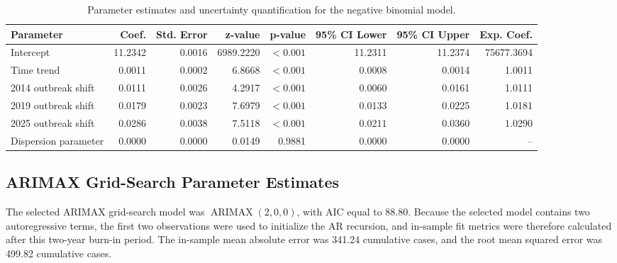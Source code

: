 \documentclass[utf8]{FrontiersinHarvard} %
\begin{document}
\begin{table}[h!]
\centering
\caption{Parameter estimates and uncertainty quantification for the negative binomial model.}
\label{tab:negative_binomial_parameter_uncertainty}
\tiny
\begin{tabular}{lrrrrrrr}
\toprule
Parameter & Coef. & Std. Error & z-value & p-value & 95\% CI Lower & 95\% CI Upper & Exp. Coef. \\
\midrule
Intercept & 11.2342 & 0.0016 & 6989.2220 & $<0.001$ & 11.2311 & 11.2374 & 75677.3694 \\
Time trend & 0.0011 & 0.0002 & 6.8668 & $<0.001$ & 0.0008 & 0.0014 & 1.0011 \\
2014 outbreak shift & 0.0111 & 0.0026 & 4.2917 & $<0.001$ & 0.0060 & 0.0161 & 1.0111 \\
2019 outbreak shift & 0.0179 & 0.0023 & 7.6979 & $<0.001$ & 0.0133 & 0.0225 & 1.0181 \\
2025 outbreak shift & 0.0286 & 0.0038 & 7.5118 & $<0.001$ & 0.0211 & 0.0360 & 1.0290 \\
Dispersion parameter & 0.0000 & 0.0000 & 0.0149 & 0.9881 & 0.0000 & 0.0000 & -- \\
\bottomrule
\end{tabular}
\end{table}

\subsection{ARIMAX Grid-Search Parameter Estimates}
The selected ARIMAX grid-search model was \(\operatorname{ARIMAX}(2,0,0)\), with AIC equal to \(88.80\). Because the selected model contains two autoregressive terms, the first two observations were used to initialize the AR recursion, and in-sample fit metrics were therefore calculated after this two-year burn-in period. The in-sample mean absolute error was 341.24 cumulative cases, and the root mean squared error was 499.82 cumulative cases.

\begin{table}[h!]
\centering
\caption{Parameter estimates for the revised ARIMAX grid-search model.}
\label{tab:arimax_parameter_uncertainty}
\end{table}
\end{document}
